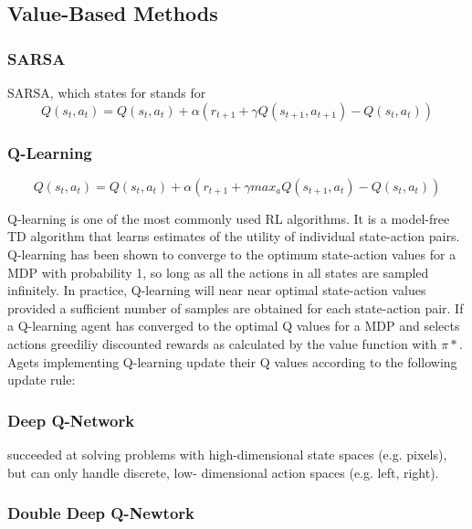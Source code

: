 \subsection{Value-Based Methods}

\subsubsection{SARSA}
SARSA, which states for stands for 
\[Q(s_t,a_t)=Q(s_t,a_t)+\alpha(r_{t+1}+\gamma Q(s_{t+1},a_{t+1})-Q(s_t,a_t))\]
\subsubsection{Q-Learning}
\[Q(s_t,a_t)=Q(s_t,a_t)+\alpha(r_{t+1}+\gamma max_aQ(s_{t+1},a_t)-Q(s_t,a_t))\]

Q-learning is one of the most commonly used RL algorithms. It is a model-free TD algorithm that learns estimates of the utility of individual state-action pairs. Q-learning has been shown to converge to the optimum state-action values for a MDP with probability 1, so long as all the actions in all states are sampled infinitely. In practice, Q-learning will near near optimal state-action values provided a sufficient number of samples are obtained for each state-action pair. If a Q-learning agent has converged to the optimal Q values for a MDP and selects actions greediliy discounted rewards as calculated by the value function with $\pi*$. Agets implementing Q-learning update their Q values according to the following update rule: 

\subsubsection{Deep Q-Network}
succeeded at solving problems with high-dimensional
state spaces (e.g. pixels), but can only handle discrete, low-
dimensional action spaces (e.g. left, right).
\subsubsection{Double Deep Q-Newtork}



